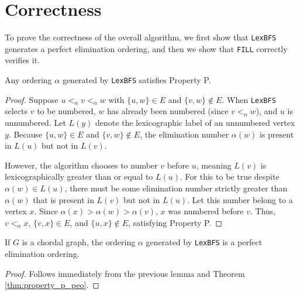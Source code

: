 \section{Correctness}

To prove the correctness of the overall algorithm, we first show that \texttt{LexBFS} generates a perfect elimination ordering, and then we show that \texttt{FILL} correctly verifies it.

\begin{lemma}
Any ordering $\alpha$ generated by \texttt{LexBFS} satisfies Property P.
\end{lemma}
\begin{proof}
Suppose $u <_\alpha v <_\alpha w$ with $\{u, w\} \in E$ and $\{v, w\} \notin E$. When \texttt{LexBFS} selects $v$ to be numbered, $w$ has already been numbered (since $v <_\alpha w$), and $u$ is unnumbered. Let $L(y)$ denote the lexicographic label of an unnumbered vertex $y$. Because $\{u, w\} \in E$ and $\{v, w\} \notin E$, the elimination number $\alpha(w)$ is present in $L(u)$ but not in $L(v)$.

However, the algorithm chooses to number $v$ before $u$, meaning $L(v)$ is lexicographically greater than or equal to $L(u)$. For this to be true despite $\alpha(w) \in L(u)$, there must be some elimination number strictly greater than $\alpha(w)$ that is present in $L(v)$ but not in $L(u)$. Let this number belong to a vertex $x$. Since $\alpha(x) > \alpha(w) > \alpha(v)$, $x$ was numbered before $v$. Thus, $v <_\alpha x$, $\{v, x\} \in E$, and $\{u, x\} \notin E$, satisfying Property P.
\end{proof}

\begin{theorem}
If $G$ is a chordal graph, the ordering $\alpha$ generated by \texttt{LexBFS} is a perfect elimination ordering.
\end{theorem}
\begin{proof}
Follows immediately from the previous lemma and Theorem \ref{thm:property_p_peo}.
\end{proof}

